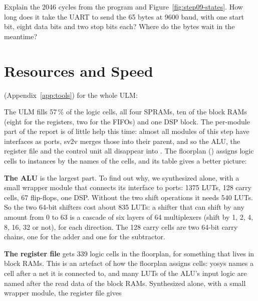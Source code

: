 \begin{exercise}
\label{ex:step09-cycles}
Explain the 2046 cycles from the program and Figure~\ref{fig:step09-states}.
How long does it take the UART to send the 65 bytes at 9600 baud, with one
start bit, eight data bits and two stop bits each? Where do the bytes wait in
the meantime?
\end{exercise}

\section{Resources and Speed}
\label{sec:step09-resources}

 (Appendix~\ref{app:tools}) for the whole ULM:


The ULM fills 57\,\% of the logic cells, all four SPRAMs, ten of the block
RAMs (eight for the registers, two for the FIFOs) and one DSP block. The
per-module part of the report is of little help this time: almost all modules
of this step have interfaces as ports, sv2v merges those into their parent,
and so the ALU, the register file and the control unit all disappear into
. The floorplan () assigns logic cells to instances
by the names of the cells, and its table gives a better picture:


\textbf{The ALU} is the largest part. To find out why, we synthesized
 alone, with a small wrapper module that connects its interface
to ports: 1375 LUTs, 128 carry cells, 67 flip-flops, one DSP. Without the two
shift operations it needs 540 LUTs. So the two 64-bit shifters cost about 835
LUTs: a shifter that can shift by any amount from 0 to 63 is a cascade of six
layers of 64 multiplexers (shift by 1, 2, 4, 8, 16, 32 or not), for each
direction. The 128 carry cells are two 64-bit carry chains, one for the
adder and one for the subtractor.

\textbf{The register file} gets 339 logic cells in the floorplan, for
something that lives in block RAMs. This is an artefact of how the floorplan
assigns cells: yosys names a cell after a net it is connected to, and many
LUTs of the ALU's input logic are named after the read data of the block RAMs.
Synthesized alone, with a small wrapper module, the register file gives


